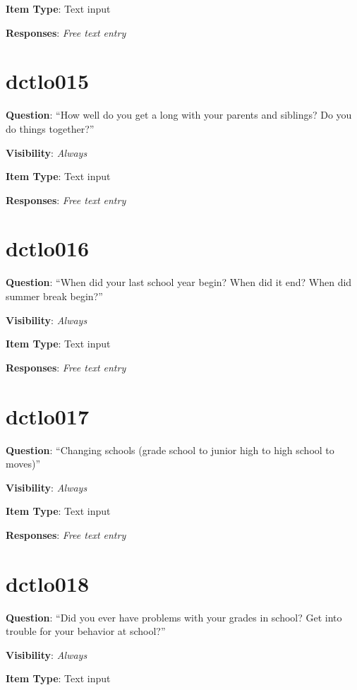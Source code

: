\documentclass[]{book}
\begin{document}
\textbf{Item Type}: Text input

\textbf{Responses}: \emph{Free text entry}

\hypertarget{dctlo015}{%
\section{dctlo015}\label{dctlo015}}

\textbf{Question}: ``How well do you get a long with your parents and siblings? Do you do things together?''

\textbf{Visibility}: \emph{Always}

\textbf{Item Type}: Text input

\textbf{Responses}: \emph{Free text entry}

\hypertarget{dctlo016}{%
\section{dctlo016}\label{dctlo016}}

\textbf{Question}: ``When did your last school year begin? When did it end? When did summer break begin?''

\textbf{Visibility}: \emph{Always}

\textbf{Item Type}: Text input

\textbf{Responses}: \emph{Free text entry}

\hypertarget{dctlo017}{%
\section{dctlo017}\label{dctlo017}}

\textbf{Question}: ``Changing schools (grade school to junior high to high school to moves)''

\textbf{Visibility}: \emph{Always}

\textbf{Item Type}: Text input

\textbf{Responses}: \emph{Free text entry}

\hypertarget{dctlo018}{%
\section{dctlo018}\label{dctlo018}}

\textbf{Question}: ``Did you ever have problems with your grades in school? Get into trouble for your behavior at school?''

\textbf{Visibility}: \emph{Always}

\textbf{Item Type}: Text input
\end{document}
